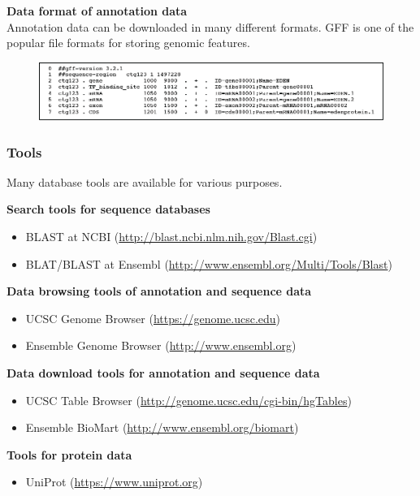 \noindent
\textbf{Data format of annotation data} \\
Annotation data can be downloaded in many different formats. GFF is one of the popular file formats for storing genomic features.
\begin{figure}[H]
  \centering
      \includegraphics[width=\textwidth]{fig05/gff3.png}
\end{figure}

%
%
\subsubsection*{Tools}
Many database tools are available for various purposes.
 
\noindent
\textbf{Search tools for sequence databases}
\begin{itemize}
\item BLAST at NCBI (\href{http://blast.ncbi.nlm.nih.gov/Blast.cgi}{http://blast.ncbi.nlm.nih.gov/Blast.cgi})
\item BLAT/BLAST at Ensembl (\href{http://www.ensembl.org/Multi/Tools/Blast}{http://www.ensembl.org/Multi/Tools/Blast})
\end{itemize}

\noindent
\textbf{Data browsing tools of annotation and sequence data}
\begin{itemize}
\item UCSC Genome Browser (\href{https://genome.ucsc.edu}{https://genome.ucsc.edu})
\item Ensemble Genome Browser (\href{http://www.ensembl.org}{http://www.ensembl.org})
\end{itemize}

\noindent
\textbf{Data download tools for annotation and sequence data}
\begin{itemize}
\item UCSC Table Browser (\href{http://genome.ucsc.edu/cgi-bin/hgTables}{http://genome.ucsc.edu/cgi-bin/hgTables})
\item Ensemble BioMart (\href{http://www.ensembl.org/biomart}{http://www.ensembl.org/biomart})
\end{itemize}

\noindent
\textbf{Tools for protein data}
\begin{itemize}
\item UniProt (\href{https://www.uniprot.org}{https://www.uniprot.org})
\end{itemize}

\bigskip 

%
